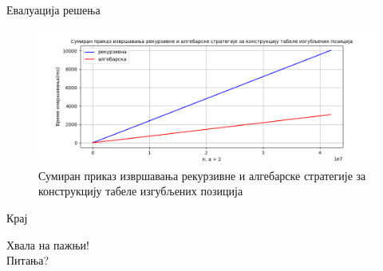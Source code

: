 \documentclass[10pt]{beamer}
\begin{document}
\begin{frame}{Евалуација решења}	
	\begin{figure}[H]
		\begin{center}
			\includegraphics[width=\textwidth]{../src/statistics/picture/algebraicVSrecursive.png}
		\end{center}
		\caption{Сумиран приказ извршавања рекурзивне и алгебарске стратегије за конструкцију табеле изгубљених позиција}
	\end{figure}
\end{frame}

\begin{frame}{Крај}
	\begin{center}
		Хвала на пажњи!\\
		Питања?
	\end{center}
\end{frame}
\end{document}
